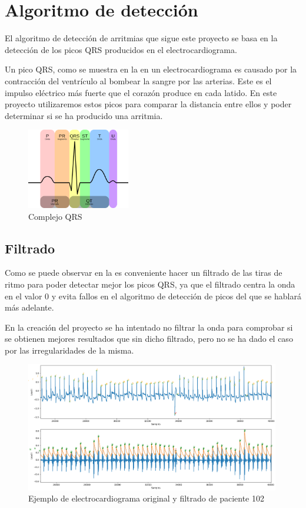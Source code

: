 \section{Algoritmo de detección}
El algoritmo de detección de arritmias que sigue este proyecto se basa en la detección de 
los picos QRS producidos en el electrocardiograma.

Un pico QRS, como se muestra en la  en un electrocardiograma es causado por la contracción del ventrículo al bombear la sangre por las arterias. Este es el impulso eléctrico más fuerte que el corazón produce en cada latido. En este proyecto utilizaremos estos picos para comparar la distancia entre ellos y poder determinar si se ha producido una arritmia. 

\begin{figure}[h]
	\centering
	\includegraphics[width=0.4\textwidth]{./Images/img_introduccion/complejoQRS.png}
	\caption[Complejo QRS]{Complejo QRS \cite{desai2021low}}
	\label{fig:complejoQRS}
\end{figure}

\subsection{Filtrado}
Como se puede observar en la  es conveniente hacer un filtrado de las tiras de ritmo para poder detectar mejor los picos QRS, ya que el filtrado centra la onda en el valor 0 y evita fallos en el algoritmo de detección de picos del que se hablará más adelante. 

En la creación del proyecto se ha intentado no filtrar la onda para comprobar si se obtienen mejores resultados que sin dicho filtrado, pero no se ha dado el caso por las irregularidades de la misma.

\begin{figure}[h!]
	\centering
	\includegraphics[width=0.99\textwidth]{./Images/img_introduccion/102filtrado_y_sin_filtrar.png}
	\caption{Ejemplo de electrocardiograma original y filtrado de paciente 102}
	\label{fig:102filtradoysinfiltrar}
\end{figure}

